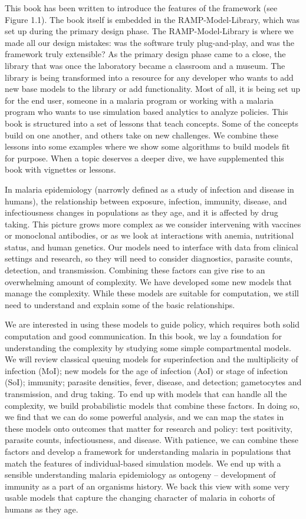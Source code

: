 \documentclass[
]{book}
\begin{document}
This book has been written to introduce the features of the framework (see Figure 1.1). The book itself is embedded in the RAMP-Model-Library, which was set up during the primary design phase. The RAMP-Model-Library is where we made all our design mistakes: was the software truly plug-and-play, and was the framework truly extensible? As the primary design phase came to a close, the library that was once the laboratory became a classroom and a museum. The library is being transformed into a resource for any developer who wants to add new base models to the library or add functionality. Most of all, it is being set up for the end user, someone in a malaria program or working with a malaria program who wants to use simulation based analytics to analyze policies. This book is structured into a set of lessons that teach concepts. Some of the concepts build on one another, and others take on new challenges. We combine these lessons into some examples where we show some algorithms to build models fit for purpose. When a topic deserves a deeper dive, we have supplemented this book with vignettes or lessons.

In malaria epidemiology (narrowly defined as a study of infection and disease in humans), the relationship between exposure, infection, immunity, disease, and infectiousness changes in populations as they age, and it is affected by drug taking. This picture grows more complex as we consider intervening with vaccines or monoclonal antibodies, or as we look at interactions with anemia, nutritional status, and human genetics. Our models need to interface with data from clinical settings and research, so they will need to consider diagnostics, parasite counts, detection, and transmission. Combining these factors can give rise to an overwhelming amount of complexity. We have developed some new models that manage the complexity. While these models are suitable for computation, we still need to understand and explain some of the basic relationships.

We are interested in using these models to guide policy, which requires both solid computation and good communication. In this book, we lay a foundation for understanding the complexity by studying some simple compartmental models. We will review classical queuing models for superinfection and the multiplicity of infection (MoI); new models for the age of infection (AoI) or stage of infection (SoI); immunity; parasite densities, fever, disease, and detection; gametocytes and transmission, and drug taking. To end up with models that can handle all the complexity, we build probabilistic models that combine these factors. In doing so, we find that we can do some powerful analysis, and we can map the states in these models onto outcomes that matter for research and policy: test positivity, parasite counts, infectiousness, and disease. With patience, we can combine these factors and develop a framework for understanding malaria in populations that match the features of individual-based simulation models. We end up with a sensible understanding malaria epidemiology as ontogeny -- development of immunity as a part of an organisms history. We back this view with some very usable models that capture the changing character of malaria in cohorts of humans as they age.
\end{document}
